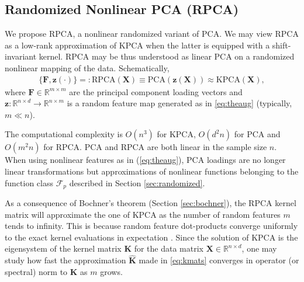 \documentclass{article}
\newcommand{\reals}{\mathbb{R}}
\begin{document}
  \subsection{Randomized Nonlinear PCA (RPCA)}
  We propose RPCA, a nonlinear randomized variant of PCA. We may view RPCA
  as a low-rank approximation of KPCA when the latter is equipped with a
  shift-invariant kernel. RPCA may be thus understood as linear PCA on a
  randomized nonlinear mapping of the data. Schematically,
  \begin{align*}
    \{ \bm F, \bm z(\cdot) \} =: \mathrm{RPCA}(\bm X) \equiv \mathrm{PCA}(\bm z(\bm
    X)) \approx \mathrm{KPCA}(\bm X),
  \end{align*}
  where $\bm F \in \mathbb{R}^{m\times m}$ are the principal component loading
  vectors and $\bm z : \mathbb{R}^{n\times d} \rightarrow \mathbb{R}^{n\times
  m}$ is a random feature map generated as in \eqref{eq:theaug} (typically, $m
  \ll n$).

  The computational complexity is $O(n^3)$ for KPCA, $O(d^2n)$ for PCA and
  $O(m^2n)$ for RPCA.  PCA and RPCA are both linear in the sample size $n$.
  When using nonlinear features as in (\ref{eq:theaug}), PCA loadings are no
  longer linear transformations but approximations of nonlinear functions
  belonging to the function class $\mathcal{F}_p$ described in Section
  \ref{sec:randomized}.
  
  As a consequence of Bochner's theorem (Section \ref{sec:bochner}), the RPCA
  kernel matrix will approximate the one of KPCA as the number of random
  features $m$ tends to infinity.  This is because random feature dot-products
  converge uniformly to the exact kernel evaluations in expectation
  \citep{Rahimi08}.  Since the solution of KPCA is the eigensystem of the
  kernel matrix $\bm K$ for the data matrix $\bm X \in \reals^{n\times d}$, one
  may study how fast the approximation $\hat{\bm K}$ made in \eqref{eq:kmats}
  converges in operator (or spectral) norm to $\bm K$ as $m$ grows.
  
\end{document}
